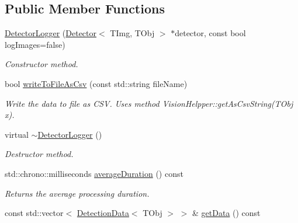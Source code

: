 \subsection*{Public Member Functions}
\begin{DoxyCompactItemize}
\item 
\hypertarget{class_vision_core_1_1_abstractions_1_1_detector_logger_af5876c32c6e7321c66a0ab299d68a391}{}\hyperlink{class_vision_core_1_1_abstractions_1_1_detector_logger_af5876c32c6e7321c66a0ab299d68a391}{Detector\+Logger} (\hyperlink{class_vision_core_1_1_interfaces_1_1_detector}{Detector}$<$ T\+Img, T\+Obj $>$ $\ast$detector, const bool log\+Images=false)\label{class_vision_core_1_1_abstractions_1_1_detector_logger_af5876c32c6e7321c66a0ab299d68a391}

\begin{DoxyCompactList}\small\item\em Constructor method. \end{DoxyCompactList}\item 
bool \hyperlink{class_vision_core_1_1_abstractions_1_1_detector_logger_a7a25babdd801ae1a4d4365a70af3032d}{write\+To\+File\+As\+Csv} (const std\+::string file\+Name)
\begin{DoxyCompactList}\small\item\em Write the data to file as C\+S\+V. Uses method Vision\+Helpper\+::get\+As\+Csv\+String(\+T\+Obj x). \end{DoxyCompactList}\item 
\hypertarget{class_vision_core_1_1_abstractions_1_1_detector_logger_a7197cfe2509322e00d3b8e1d2deda792}{}virtual \hyperlink{class_vision_core_1_1_abstractions_1_1_detector_logger_a7197cfe2509322e00d3b8e1d2deda792}{$\sim$\+Detector\+Logger} ()\label{class_vision_core_1_1_abstractions_1_1_detector_logger_a7197cfe2509322e00d3b8e1d2deda792}

\begin{DoxyCompactList}\small\item\em Destructor method. \end{DoxyCompactList}\item 
\hypertarget{class_vision_core_1_1_abstractions_1_1_detector_logger_a19b6ea758a0d8c45cfee3859eb483b67}{}std\+::chrono\+::milliseconds \hyperlink{class_vision_core_1_1_abstractions_1_1_detector_logger_a19b6ea758a0d8c45cfee3859eb483b67}{average\+Duration} () const \label{class_vision_core_1_1_abstractions_1_1_detector_logger_a19b6ea758a0d8c45cfee3859eb483b67}

\begin{DoxyCompactList}\small\item\em Returns the average processing duration. \end{DoxyCompactList}\item 
\hypertarget{class_vision_core_1_1_abstractions_1_1_detector_logger_ab52843f46819e59162d432e25766d429}{}const std\+::vector$<$ \hyperlink{struct_vision_core_1_1_abstractions_1_1_detection_data}{Detection\+Data}$<$ T\+Obj $>$ $>$ \& \hyperlink{class_vision_core_1_1_abstractions_1_1_detector_logger_ab52843f46819e59162d432e25766d429}{get\+Data} () const \label{class_vision_core_1_1_abstractions_1_1_detector_logger_ab52843f46819e59162d432e25766d429}


\end{DoxyCompactItemize}
